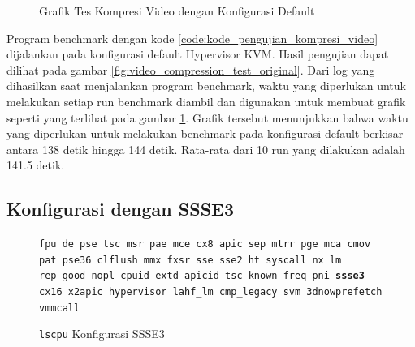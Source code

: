 \begin{figure}
    \centering
    \caption{Grafik Tes Kompresi Video dengan Konfigurasi Default}
    \label{fig:video_compression_test_original_graph}
\end{figure}

Program benchmark dengan kode \ref{code:kode_pengujian_kompresi_video} dijalankan pada konfigurasi default Hypervisor KVM. Hasil pengujian dapat dilihat pada gambar \ref{fig:video_compression_test_original}. Dari log yang dihasilkan saat menjalankan program benchmark, waktu yang diperlukan untuk melakukan setiap run benchmark diambil dan digunakan untuk membuat grafik seperti yang terlihat pada gambar \ref{fig:video_compression_test_original_graph}. Grafik tersebut menunjukkan bahwa waktu yang diperlukan untuk melakukan benchmark pada konfigurasi default berkisar antara 138 detik hingga 144 detik. Rata-rata dari 10 run yang dilakukan adalah 141.5 detik.

\subsection{Konfigurasi dengan SSSE3}
\begin{figure}
    \texttt{fpu de pse tsc msr pae mce cx8 apic sep mtrr pge mca cmov pat pse36 clflush mmx fxsr sse sse2 ht syscall nx lm rep\_good nopl cpuid extd\_apicid tsc\_known\_freq pni \textbf{ssse3} cx16 x2apic hypervisor lahf\_lm cmp\_legacy svm 3dnowprefetch vmmcall}
    \caption{\texttt{lscpu} Konfigurasi SSSE3}
    \label{fig:lscpu_video_compression_test_ssse3}
\end{figure}

